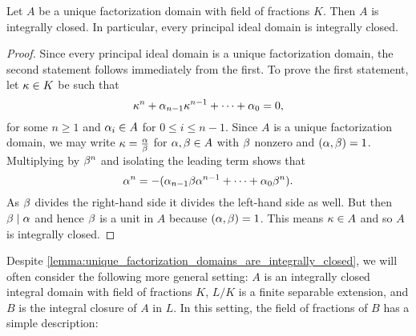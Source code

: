     \begin{lemma}\label{lemma:unique_factorization_domains_are_integrally_closed}
      Let $A$ be a unique factorization domain with field of fractions $K$. Then $A$ is integrally closed. In particular, every principal ideal domain is integrally closed.
    \end{lemma}
    \begin{proof}
      Since every principal ideal domain is a unique factorization domain, the second statement follows immediately from the first. To prove the first statement, let $\kappa \in K$ be such that
      \[
        \kappa^{n}+\alpha_{n-1}\kappa^{n-1}+\cdots+\alpha_{0} = 0,
      \]
      for some $n \ge 1$ and $\alpha_{i} \in A$ for $0 \le i \le n-1$. Since $A$ is a unique factorization domain, we may write $\kappa = \frac{\alpha}{\beta}$ for $\alpha,\beta \in A$ with $\beta$ nonzero and $(\alpha,\beta) = 1$. Multiplying by $\beta^{n}$ and isolating the leading term shows that
      \[
        \alpha^{n} = -(\alpha_{n-1}\beta\alpha^{n-1}+\cdots+\alpha_{0}\beta^{n}).
      \] 
      As $\beta$ divides the right-hand side it divides the left-hand side as well. But then $\beta \mid \alpha$ and hence $\beta$ is a unit in $A$ because $(\alpha,\beta) = 1$. This means $\kappa \in A$ and so $A$ is integrally closed.
    \end{proof}
    
    Despite \cref{lemma:unique_factorization_domains_are_integrally_closed}, we will often consider the following more general setting: $A$ is an integrally closed integral domain with field of fractions $K$, $L/K$ is a finite separable extension, and $B$ is the integral closure of $A$ in $L$. In this setting, the field of fractions of $B$ has a simple description:

